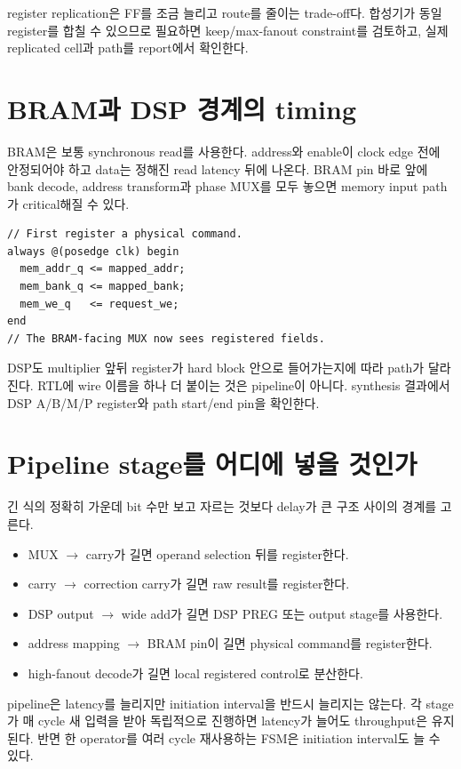 register replication은 FF를 조금 늘리고 route를 줄이는 trade-off다. 합성기가
동일 register를 합칠 수 있으므로 필요하면 keep/max-fanout constraint를 검토하고,
실제 replicated cell과 path를 report에서 확인한다.

\section{BRAM과 DSP 경계의 timing}

BRAM은 보통 synchronous read를 사용한다. address와 enable이 clock edge 전에
안정되어야 하고 data는 정해진 read latency 뒤에 나온다. BRAM pin 바로 앞에
bank decode, address transform과 phase MUX를 모두 놓으면 memory input path가
critical해질 수 있다.

\begin{lstlisting}
// First register a physical command.
always @(posedge clk) begin
  mem_addr_q <= mapped_addr;
  mem_bank_q <= mapped_bank;
  mem_we_q   <= request_we;
end
// The BRAM-facing MUX now sees registered fields.
\end{lstlisting}

DSP도 multiplier 앞뒤 register가 hard block 안으로 들어가는지에 따라 path가
달라진다. RTL에 wire 이름을 하나 더 붙이는 것은 pipeline이 아니다. synthesis
결과에서 DSP A/B/M/P register와 path start/end pin을 확인한다.

\section{Pipeline stage를 어디에 넣을 것인가}

긴 식의 정확히 가운데 bit 수만 보고 자르는 것보다 delay가 큰 구조 사이의
경계를 고른다.

\begin{itemize}
  \item MUX $\rightarrow$ carry가 길면 operand selection 뒤를 register한다.
  \item carry $\rightarrow$ correction carry가 길면 raw result를 register한다.
  \item DSP output $\rightarrow$ wide add가 길면 DSP PREG 또는 output stage를 사용한다.
  \item address mapping $\rightarrow$ BRAM pin이 길면 physical command를 register한다.
  \item high-fanout decode가 길면 local registered control로 분산한다.
\end{itemize}

pipeline은 latency를 늘리지만 initiation interval을 반드시 늘리지는 않는다. 각
stage가 매 cycle 새 입력을 받아 독립적으로 진행하면 latency가 늘어도 throughput은
유지된다. 반면 한 operator를 여러 cycle 재사용하는 FSM은 initiation interval도
늘 수 있다.

